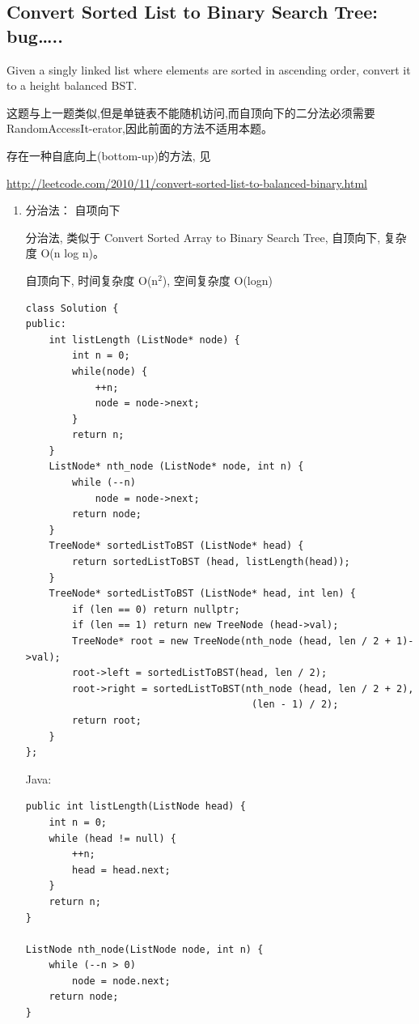 \documentclass[12pt]{book}
\begin{document}
\subsection{Convert Sorted List to Binary Search Tree: bug\ldots{}..}
\label{sec-4-4-3}
Given a singly linked list where elements are sorted in ascending order, convert it to a height balanced BST.

这题与上一题类似,但是单链表不能随机访问,而自顶向下的二分法必须需要 RandomAccessIt-erator,因此前面的方法不适用本题。

存在一种自底向上(bottom-up)的方法, 见 

\url{http://leetcode.com/2010/11/convert-sorted-list-to-balanced-binary.html}

\begin{enumerate}
\item 分治法： 自项向下
\label{sec-4-4-3-1}

分治法, 类似于 Convert Sorted Array to Binary Search Tree, 自顶向下, 复杂度 O(n log n)。

自顶向下, 时间复杂度 O(n$^{\text{2}}$), 空间复杂度 O(logn)

\lstset{language=java,label= ,caption= ,numbers=none}
\begin{lstlisting}
class Solution {
public:
    int listLength (ListNode* node) {
        int n = 0;
        while(node) {
            ++n;
            node = node->next;
        }
        return n;
    }
    ListNode* nth_node (ListNode* node, int n) {
        while (--n)
            node = node->next;
        return node;
    }
    TreeNode* sortedListToBST (ListNode* head) {
        return sortedListToBST (head, listLength(head));
    }
    TreeNode* sortedListToBST (ListNode* head, int len) {
        if (len == 0) return nullptr;
        if (len == 1) return new TreeNode (head->val);
        TreeNode* root = new TreeNode(nth_node (head, len / 2 + 1)->val);
        root->left = sortedListToBST(head, len / 2);
        root->right = sortedListToBST(nth_node (head, len / 2 + 2),
                                       (len - 1) / 2);
        return root;
    }
};
\end{lstlisting}

Java: 
\lstset{language=java,label= ,caption= ,numbers=none}
\begin{lstlisting}
public int listLength(ListNode head) {
    int n = 0;
    while (head != null) {
        ++n;
        head = head.next;
    }
    return n;
}

ListNode nth_node(ListNode node, int n) {
    while (--n > 0) 
        node = node.next;
    return node;
}
        

\end{lstlisting}
\end{enumerate}
\end{document}
